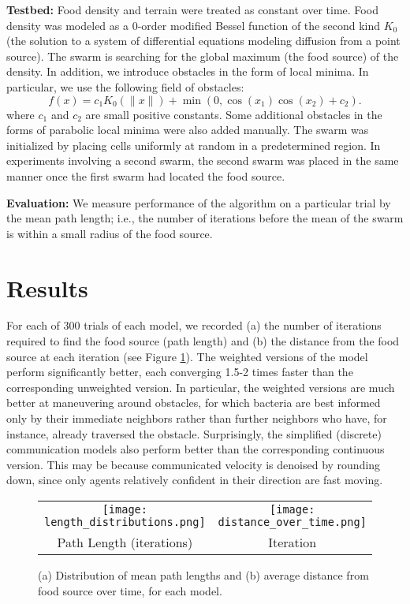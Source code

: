\documentclass{article}
\begin{document}
{\bf Testbed:} Food density and terrain were treated as constant over
time. Food density was modeled as a $0$-order modified Bessel function of the
second kind $K_0$ (the solution to a system of differential equations modeling
diffusion from a point source). The swarm is searching for the global maximum
(the food source) of the density. In addition, we introduce obstacles in the
form of local minima. In particular, we use the following field of
obstacles:
\begin{equation}
f(x) = c_1K_0(\|x\|) + \min(0,\cos(x_1)\cos(x_2) + c_2).
\label{eq:terrain}
\end{equation}
where $c_1$ and $c_2$ are small positive constants. Some additional obstacles
in the forms of parabolic local minima were also added manually. The swarm was
initialized by placing cells uniformly at random in a predetermined region. In
experiments involving a second swarm, the second swarm was placed in the same
manner once the first swarm had located the food source.

{\bf Evaluation:} We measure performance of the algorithm on a
particular trial by the mean path length; i.e., the number of iterations before
the mean of the swarm is within a small radius of the food source. 

\section*{Results}

For each of 300 trials of each model, we recorded (a) the number of iterations
required to find the food source (path length) and (b) the distance from the
food source at each iteration (see Figure \ref{fig:res}). The weighted
versions of the model perform significantly better, each converging 1.5-2 times
faster than the corresponding unweighted version. In particular, the weighted
versions are much better at maneuvering around obstacles, for which bacteria
are best informed only by their immediate neighbors rather than further
neighbors who have, for instance, already traversed the obstacle. Surprisingly,
the simplified (discrete) communication models also perform better than the
corresponding continuous version. This may be because communicated velocity is
denoised by rounding down, since only agents relatively confident in their
direction are fast moving.


\begin{figure}[h!]
\begin{tabular}[h]{cc}
\centering
\texttt{[image: length\_distributions.png]}
    & \texttt{[image: distance\_over\_time.png]}\\
Path Length (iterations)
    & Iteration
\end{tabular}
\vspace{-3mm}
\caption{(a) Distribution of mean path lengths and (b) average distance from
food source over time, for each model.}
\label{fig:res}
\end{figure}
\end{document}
